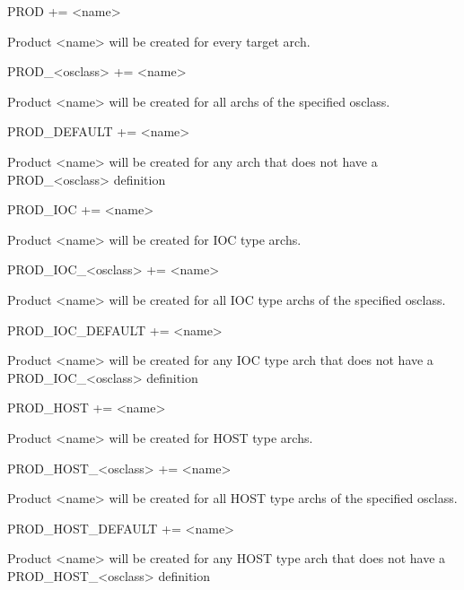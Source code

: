 \begin{description}

\item {}PROD += \textless{}name\textgreater{}

Product \textless{}name\textgreater{} will be created for every target arch.

\item PROD\_\textless{}osclass\textgreater{} += \textless{}name\textgreater{}

Product \textless{}name\textgreater{} will be created for all archs of the specified osclass.

\item PROD\_DEFAULT += \textless{}name\textgreater{}

Product \textless{}name\textgreater{} will be created for any arch that does not have a PROD\_\textless{}osclass\textgreater{} definition

\item

\item {}PROD\_IOC += \textless{}name\textgreater{}

Product \textless{}name\textgreater{} will be created for IOC type archs.

\item PROD\_IOC\_\textless{}osclass\textgreater{} += \textless{}name\textgreater{}

Product \textless{}name\textgreater{} will be created for all IOC type archs of the specified osclass.

\item PROD\_IOC\_DEFAULT += \textless{}name\textgreater{}

Product \textless{}name\textgreater{} will be created for any IOC type arch that does not have a PROD\_IOC\_\textless{}osclass\textgreater{} 
definition

\item

\item {}PROD\_HOST += \textless{}name\textgreater{}

Product \textless{}name\textgreater{} will be created for HOST type archs.

\item PROD\_HOST\_\textless{}osclass\textgreater{} += \textless{}name\textgreater{}

Product \textless{}name\textgreater{} will be created for all HOST type archs of the specified osclass.

\item PROD\_HOST\_DEFAULT += \textless{}name\textgreater{}

Product \textless{}name\textgreater{} will be created for any HOST type arch that does not have a PROD\_HOST\_\textless{}osclass\textgreater{} 
definition

\end{description}

